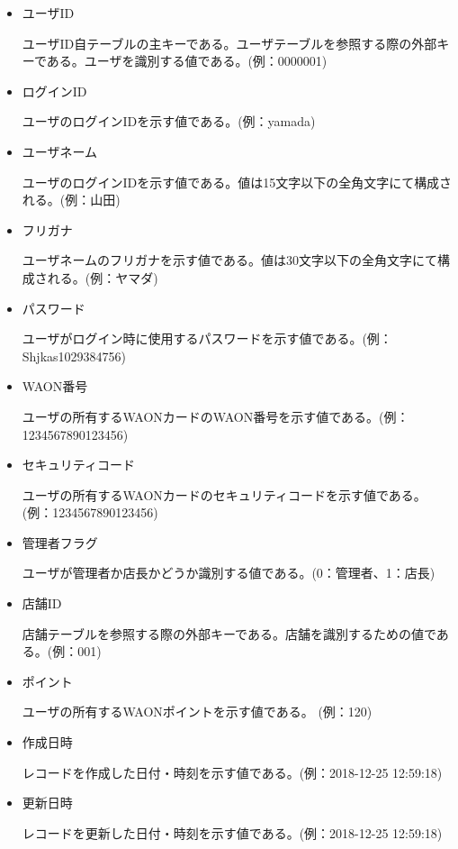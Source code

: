 \documentclass[a4j]{jarticle}
\begin{document}
\begin{itemize}

\item ユーザID

  ユーザID自テーブルの主キーである。ユーザテーブルを参照する際の外部キーである。ユーザを識別する値である。(例：0000001)

\item ログインID

  ユーザのログインIDを示す値である。(例：yamada)

\item ユーザネーム

  ユーザのログインIDを示す値である。値は15文字以下の全角文字にて構成される。(例：山田)

\item フリガナ

  ユーザネームのフリガナを示す値である。値は30文字以下の全角文字にて構成される。(例：ヤマダ)

\item パスワード

  ユーザがログイン時に使用するパスワードを示す値である。(例：Shjkas1029384756)

\item WAON番号

  ユーザの所有するWAONカードのWAON番号を示す値である。(例：1234567890123456)

\item セキュリティコード

  ユーザの所有するWAONカードのセキュリティコードを示す値である。(例：1234567890123456)

\item 管理者フラグ

  ユーザが管理者か店長かどうか識別する値である。(0：管理者、1：店長)

\item 店舗ID

  店舗テーブルを参照する際の外部キーである。店舗を識別するための値である。(例：001)

\item ポイント

  ユーザの所有するWAONポイントを示す値である。 (例：120)

\item 作成日時

  レコードを作成した日付・時刻を示す値である。(例：2018-12-25 12:59:18)

\item 更新日時

  レコードを更新した日付・時刻を示す値である。(例：2018-12-25 12:59:18)
\end{itemize}
\end{document}
